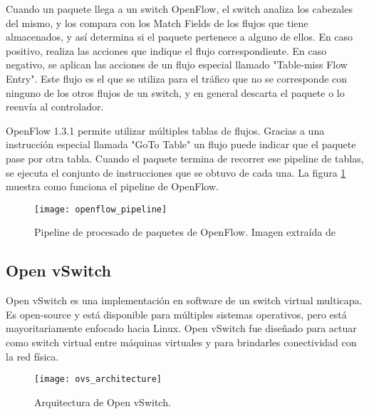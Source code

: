 Cuando un paquete llega a un switch OpenFlow, el switch analiza los cabezales del mismo, y los compara con los Match Fields de los flujos que tiene almacenados, y así determina si el paquete pertenece a alguno de ellos. En caso positivo, realiza las acciones que indique el flujo correspondiente. En caso negativo, se aplican las acciones de un flujo especial llamado "Table-miss Flow Entry". Este flujo es el que se utiliza para el tráfico que no se corresponde con ninguno de los otros flujos de un switch, y en general descarta el paquete o lo reenvía al controlador.

OpenFlow 1.3.1 permite utilizar múltiples tablas de flujos. Gracias a una instrucción especial llamada "GoTo Table" un flujo puede indicar que el paquete pase por otra tabla. Cuando el paquete termina de recorrer ese pipeline de tablas, se ejecuta el conjunto de instrucciones que se obtuvo de cada una. La figura \ref{fig:openflow_pipeline} muestra como funciona el pipeline de OpenFlow.

\begin{figure}[h] 
	\centering    
	\texttt{[image: openflow\_pipeline]}
	\caption{Pipeline de procesado de paquetes de OpenFlow. Imagen extraída de \cite{openflow-1.3.1}}
	\label{fig:openflow_pipeline}
\end{figure}

\subsection{Open vSwitch}
Open vSwitch \cite{ovs} es una implementación en software de un switch virtual multicapa. Es open-source y está disponible para múltiples sistemas operativos, pero está mayoritariamente enfocado hacia Linux. Open vSwitch fue diseñado para actuar como switch virtual entre máquinas virtuales y para brindarles conectividad con la red física.

\begin{figure}[H] 
	\centering    
	\texttt{[image: ovs\_architecture]}
	\caption{Arquitectura de Open vSwitch.}
	\label{fig:ovs_architecture}
\end{figure}


